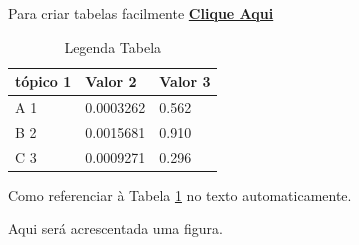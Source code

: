 


        Para criar tabelas facilmente \href{https://www.tablesgenerator.com/}{\textbf{Clique Aqui}}

        \begin{table}[h]  %
            \caption{Legenda Tabela}
            \label{tab:exemplo}             %

            \centering
            \begin{tabular}{l l l}
                \toprule
                \textbf{tópico 1} & \textbf{Valor 2} & \textbf{Valor 3}\\
                \midrule
                A 1 & 0.0003262 & 0.562 \\
                B 2 & 0.0015681 & 0.910 \\
                C 3 & 0.0009271 & 0.296 \\
                \bottomrule
            \end{tabular}
        \end{table}  %



    Como referenciar à Tabela  \ref{tab:exemplo} no texto automaticamente.




        Aqui será acrescentada uma figura.


